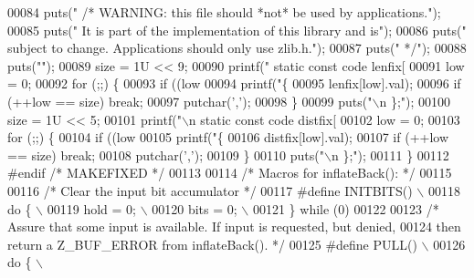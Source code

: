 \begin{DoxyCode}
00084     puts(\textcolor{stringliteral}{"    /* WARNING: this file should *not* be used by applications."});
00085     puts(\textcolor{stringliteral}{"       It is part of the implementation of this library and is"});
00086     puts(\textcolor{stringliteral}{"       subject to change. Applications should only use zlib.h."});
00087     puts(\textcolor{stringliteral}{"     */"});
00088     puts(\textcolor{stringliteral}{""});
00089     size = 1U << 9;
00090     printf(\textcolor{stringliteral}{"    static const code lenfix[%
00091     low = 0;
00092     \textcolor{keywordflow}{for} (;;) \{
00093         \textcolor{keywordflow}{if} ((low %
00094         printf(\textcolor{stringliteral}{"\{%
00095                lenfix[low].val);
00096         \textcolor{keywordflow}{if} (++low == size) \textcolor{keywordflow}{break};
00097         putchar(\textcolor{charliteral}{','});
00098     \}
00099     puts(\textcolor{stringliteral}{"\(\backslash\)n    \};"});
00100     size = 1U << 5;
00101     printf(\textcolor{stringliteral}{"\(\backslash\)n    static const code distfix[%
00102     low = 0;
00103     \textcolor{keywordflow}{for} (;;) \{
00104         \textcolor{keywordflow}{if} ((low %
00105         printf(\textcolor{stringliteral}{"\{%
00106                distfix[low].val);
00107         \textcolor{keywordflow}{if} (++low == size) \textcolor{keywordflow}{break};
00108         putchar(\textcolor{charliteral}{','});
00109     \}
00110     puts(\textcolor{stringliteral}{"\(\backslash\)n    \};"});
00111 \}
00112 \textcolor{preprocessor}{#endif }\textcolor{comment}{/* MAKEFIXED */}\textcolor{preprocessor}{}
00113 
00114 \textcolor{comment}{/* Macros for inflateBack(): */}
00115 
00116 \textcolor{comment}{/* Clear the input bit accumulator */}
00117 \textcolor{preprocessor}{#define INITBITS() \(\backslash\)}
00118 \textcolor{preprocessor}{    do \{ \(\backslash\)}
00119 \textcolor{preprocessor}{        hold = 0; \(\backslash\)}
00120 \textcolor{preprocessor}{        bits = 0; \(\backslash\)}
00121 \textcolor{preprocessor}{    \} while (0)}
00122 
00123 \textcolor{comment}{/* Assure that some input is available.  If input is requested, but denied,}
00124 \textcolor{comment}{   then return a Z\_BUF\_ERROR from inflateBack(). */}
00125 \textcolor{preprocessor}{#define PULL() \(\backslash\)}
00126 \textcolor{preprocessor}{    do \{ \(\backslash\)}
}}}}
\end{DoxyCode}
